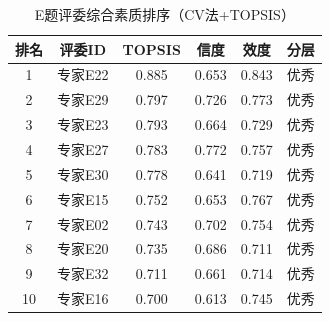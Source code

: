 \begin{table}[h]
\centering
\caption{E题评委综合素质排序（CV法+TOPSIS）}
\begin{tabular}{cccccc}
\hline
排名 & 评委ID & TOPSIS & 信度 & 效度 & 分层 \\
\hline
1 & 专家E22 & 0.885 & 0.653 & 0.843 & 优秀 \\
2 & 专家E29 & 0.797 & 0.726 & 0.773 & 优秀 \\
3 & 专家E23 & 0.793 & 0.664 & 0.729 & 优秀 \\
4 & 专家E27 & 0.783 & 0.772 & 0.757 & 优秀 \\
5 & 专家E30 & 0.778 & 0.641 & 0.719 & 优秀 \\
6 & 专家E15 & 0.752 & 0.653 & 0.767 & 优秀 \\
7 & 专家E02 & 0.743 & 0.702 & 0.754 & 优秀 \\
8 & 专家E20 & 0.735 & 0.686 & 0.711 & 优秀 \\
9 & 专家E32 & 0.711 & 0.661 & 0.714 & 优秀 \\
10 & 专家E16 & 0.700 & 0.613 & 0.745 & 优秀 \\
\hline
\end{tabular}
\end{table}